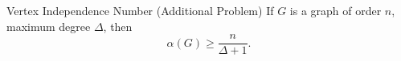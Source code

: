 \begin{frame}{}
  \begin{exampleblock}{Vertex Independence Number (Additional Problem)}
    If $G$ is a graph of order $n$, maximum degree $\Delta$, then
    \[
      \alpha(G) \ge \frac{n}{\Delta + 1}.
    \]
  \end{exampleblock}

  \pause
  \begin{center}
     \\[6pt] \pause
  \end{center}

  \pause
  \begin{columns}
      
  \end{columns}
\end{frame}
